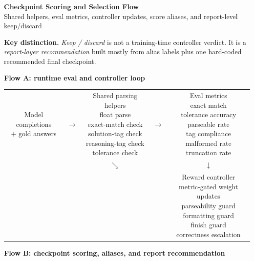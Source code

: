 \documentclass[11pt]{article}
\newcommand{\flowbox}[1]{\fcolorbox{black}{gray!8}{\parbox[c][2.0cm][c]{0.21\textwidth}{\centering\footnotesize #1}}}
\begin{document}
\begin{center}
{\LARGE \textbf{Checkpoint Scoring and Selection Flow}}\\[0.4em]
{\large Shared helpers, eval metrics, controller updates, score aliases, and report-level keep/discard}\\[0.6em]
\end{center}

\noindent\textbf{Key distinction.}
\emph{Keep / discard} is not a training-time controller verdict.
It is a \emph{report-layer recommendation} built mostly from alias labels plus one hard-coded recommended final checkpoint.

\vspace{0.6em}
\noindent\textbf{Flow A: runtime eval and controller loop}

\begin{center}
\renewcommand{\arraystretch}{1.2}
\begin{tabular}{c c c c c}
\flowbox{Model completions\\ + gold answers} &
$\rightarrow$ &
\flowbox{Shared parsing helpers\\ float parse\\ exact-match check\\ solution-tag check\\ reasoning-tag check\\ tolerance check} &
$\rightarrow$ &
\flowbox{Eval metrics\\ exact match\\ tolerance accuracy\\ parseable rate\\ tag compliance\\ malformed rate\\ truncation rate} \\
& & $\searrow$ & & $\downarrow$ \\
& & & &
\flowbox{Reward controller\\ metric-gated weight updates\\ parseability guard\\ formatting guard\\ finish guard\\ correctness escalation} \\
\end{tabular}
\end{center}

\vspace{0.3em}
\noindent\textbf{Flow B: checkpoint scoring, aliases, and report recommendation}
\end{document}
